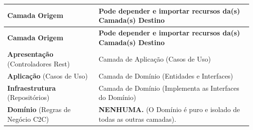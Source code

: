 \documentclass[12pt, a4paper]{article}
\begin{document}
\begin{longtable}{|p{3.5cm}|p{10.5cm}|}
\hline
\textbf{Camada Origem} & \textbf{Pode depender e importar recursos da(s) Camada(s) Destino} \\
\hline
\endfirsthead
\hline
\textbf{Camada Origem} & \textbf{Pode depender e importar recursos da(s) Camada(s) Destino} \\
\hline
\endhead
\textbf{Apresentação} (Controladores Rest) & Camada de Aplicação (Casos de Uso) \\
\hline
\textbf{Aplicação} (Casos de Uso) & Camada de Domínio (Entidades e Interfaces) \\
\hline
\textbf{Infraestrutura} (Repositórios) & Camada de Domínio (Implementa as Interfaces do Domínio) \\
\hline
\textbf{Domínio} (Regras de Negócio C2C) & \textbf{NENHUMA.} (O Domínio é puro e isolado de todas as outras camadas). \\
\hline
\end{longtable}
\end{document}
